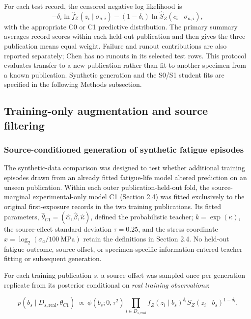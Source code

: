 \documentclass[12pt,a4paper]{article}
\begin{document}
For each test record, the censored negative log likelihood is
\[
-\delta_i\ln\widehat{f}_Z(z_i\mid\sigma_{a,i})
-(1-\delta_i)\ln\widehat{S}_Z(c_i\mid\sigma_{a,i}),
\]
with the appropriate C0 or C1 predictive distribution. The primary summary averages record scores within each held-out publication and then gives the three publication means equal weight. Failure and runout contributions are also reported separately; Chen has no runouts in its selected test rows. This protocol evaluates transfer to a new publication rather than fit to another specimen from a known publication. Synthetic generation and the S0/S1 student fits are specified in the following Methods subsection.


\subsection{Training-only augmentation and source filtering}

\subsubsection{Source-conditioned generation of synthetic fatigue episodes}

The synthetic-data comparison was designed to test whether additional training episodes drawn from an already fitted fatigue-life model altered prediction on an unseen publication. Within each outer publication-held-out fold, the source-marginal experimental-only model C1 (Section 2.4) was fitted exclusively to the original first-exposure records in the two training publications. Its fitted parameters, \(\widehat{\theta}_{C1}=(\widehat{\alpha},\widehat{\beta},\widehat{\kappa})\), defined the probabilistic teacher; \(k=\exp(\kappa)\), the source-effect standard deviation \(\tau=0.25\), and the stress coordinate \(x=\log_2(\sigma_a/100\ \mathrm{MPa})\) retain the definitions in Section 2.4. No held-out fatigue outcome, source offset, or specimen-specific information entered teacher fitting or subsequent generation.

For each training publication \(s\), a source offset was sampled once per generation replicate from its posterior conditional on \emph{real training observations}:

\begin{equation}
p(b_s\mid D_{s,\mathrm{real}},\widehat{\theta}_{C1})
\ \propto\
\phi(b_s;0,\tau^2)
\prod_{i\in D_{s,\mathrm{real}}}
f_Z(z_i\mid b_s)^{\delta_i}
S_Z(z_i\mid b_s)^{1-\delta_i}.
\tag{2.5a}
\end{equation}
\end{document}
